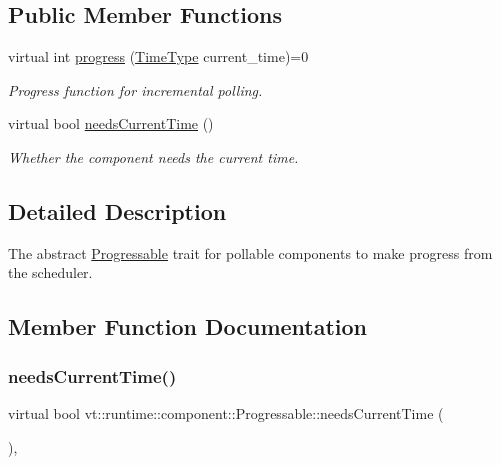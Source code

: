 \subsection*{Public Member Functions}
\begin{DoxyCompactItemize}
\item 
virtual int \hyperlink{structvt_1_1runtime_1_1component_1_1_progressable_a75f1e623643f2273835fdf047d3d0cd3}{progress} (\hyperlink{namespacevt_a876a9d0cd5a952859c72de8a46881442}{Time\+Type} current\+\_\+time)=0
\begin{DoxyCompactList}\small\item\em Progress function for incremental polling. \end{DoxyCompactList}\item 
virtual bool \hyperlink{structvt_1_1runtime_1_1component_1_1_progressable_a86dd4c58e43f7dbf6bd67f7a8e6df088}{needs\+Current\+Time} ()
\begin{DoxyCompactList}\small\item\em Whether the component needs the current time. \end{DoxyCompactList}\end{DoxyCompactItemize}


\subsection{Detailed Description}
The abstract {\ttfamily \hyperlink{structvt_1_1runtime_1_1component_1_1_progressable}{Progressable}} trait for pollable components to make progress from the scheduler. 

\subsection{Member Function Documentation}
\mbox{\label{structvt_1_1runtime_1_1component_1_1_progressable_a86dd4c58e43f7dbf6bd67f7a8e6df088}} 
\subsubsection{\texorpdfstring{needs\+Current\+Time()}{needsCurrentTime()}}
{\footnotesize\ttfamily virtual bool vt\+::runtime\+::component\+::\+Progressable\+::needs\+Current\+Time (\begin{DoxyParamCaption}{ }\end{DoxyParamCaption})\hspace{0.3cm}{\ttfamily [inline]}, {\ttfamily [virtual]}}



